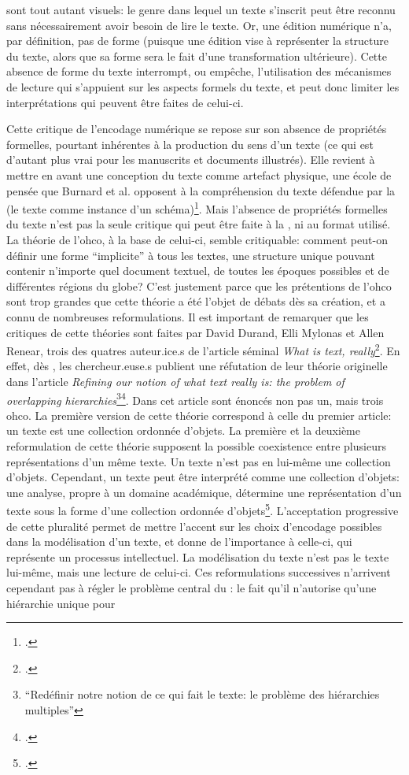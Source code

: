 sont tout autant visuels: le genre dans lequel un texte s'inscrit peut être reconnu sans nécessairement avoir besoin de lire le texte. Or, une édition numérique n'a, par définition, pas de forme (puisque une édition \xml{} vise à représenter la structure du texte, alors que sa forme sera le fait d'une transformation ultérieure). Cette absence de forme du texte interrompt, ou empêche, l'utilisation des mécanismes de lecture qui s'appuient sur les aspects formels du texte, et peut donc limiter les interprétations qui peuvent être faites de celui-ci.

Cette critique de l'encodage numérique se repose sur son absence de propriétés formelles, pourtant inhérentes à la production du sens d'un texte (ce qui est d'autant plus vrai pour les manuscrits et documents illustrés). Elle revient à mettre en avant une conception du texte comme artefact physique, une école de pensée que Burnard et al. opposent à la compréhension du texte défendue par la \tei{} (le texte comme instance d'un schéma)\footcite[§ 3]{burnard_search_2021}. Mais l'absence de propriétés formelles du texte n'est pas la seule critique qui peut être faite à la \tei{}, ni au format \xml{} utilisé. La théorie de l'\gls{ohco}, à la base de celui-ci, semble critiquable: comment peut-on définir une forme \enquote{implicite} à tous les textes, une structure unique pouvant contenir n'importe quel document textuel, de toutes les époques possibles et de différentes régions du globe? C'est justement parce que les prétentions de l'\gls{ohco} sont trop grandes que cette théorie a été l'objet de débats dès sa création, et a connu de nombreuses reformulations. Il est important de remarquer que les critiques de cette théories sont faites par David Durand, Elli Mylonas et Allen Renear, trois des quatres auteur.ice.s de l'article séminal \textit{What is text, really}\footcite{derose_what_1990}. En effet, dès , les chercheur.euse.s publient une réfutation de leur théorie originelle dans l'article \textit{Refining our notion of what text really is: the problem of overlapping hierarchies}\footnote{\enquote{Redéfinir notre notion de ce qui fait le texte: le problème des hiérarchies multiples}}\footcite{renear_refining_1996}. Dans cet article sont énoncés non pas un, mais trois \gls{ohco}. La première version de cette théorie correspond à celle du premier article: un texte est une collection ordonnée d'objets. La première et la deuxième reformulation de cette théorie supposent la possible coexistence entre plusieurs représentations d'un même texte. Un texte n'est pas en lui-même une collection d'objets. Cependant, un texte peut être interprété comme une collection d'objets: une analyse, propre à un domaine académique, détermine une représentation d'un texte sous la forme d'une collection ordonnée d'objets\footcite{renear_refining_1996}. L'acceptation progressive de cette pluralité permet de mettre l'accent sur les choix d'encodage possibles dans la modélisation d'un texte, et donne de l'importance à celle-ci, qui représente un processus intellectuel. La modélisation du texte n'est pas le texte lui-même, mais une lecture de celui-ci. Ces reformulations successives n'arrivent cependant pas à régler le problème central du \xml{}: le fait qu'il n'autorise qu'une hiérarchie unique pour 